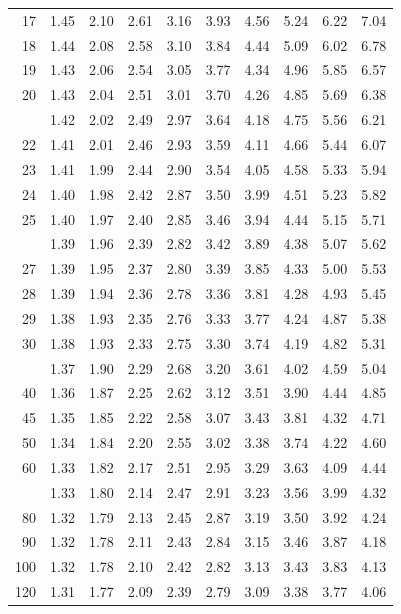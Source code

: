 \documentclass[10pt]{article}
\begin{document}
\begin{longtable}{@{}r!{\vrule width 0.8pt\hspace{0.55em}}rrrrrrrrr@{}}
17 & 1.45 & 2.10 & 2.61 & 3.16 & 3.93 & 4.56 & 5.24 & 6.22 & 7.04 \\
18 & 1.44 & 2.08 & 2.58 & 3.10 & 3.84 & 4.44 & 5.09 & 6.02 & 6.78 \\
19 & 1.43 & 2.06 & 2.54 & 3.05 & 3.77 & 4.34 & 4.96 & 5.85 & 6.57 \\
20 & 1.43 & 2.04 & 2.51 & 3.01 & 3.70 & 4.26 & 4.85 & 5.69 & 6.38 \\
 & 1.42 & 2.02 & 2.49 & 2.97 & 3.64 & 4.18 & 4.75 & 5.56 & 6.21 \\
22 & 1.41 & 2.01 & 2.46 & 2.93 & 3.59 & 4.11 & 4.66 & 5.44 & 6.07 \\
23 & 1.41 & 1.99 & 2.44 & 2.90 & 3.54 & 4.05 & 4.58 & 5.33 & 5.94 \\
24 & 1.40 & 1.98 & 2.42 & 2.87 & 3.50 & 3.99 & 4.51 & 5.23 & 5.82 \\
25 & 1.40 & 1.97 & 2.40 & 2.85 & 3.46 & 3.94 & 4.44 & 5.15 & 5.71 \\
 & 1.39 & 1.96 & 2.39 & 2.82 & 3.42 & 3.89 & 4.38 & 5.07 & 5.62 \\
27 & 1.39 & 1.95 & 2.37 & 2.80 & 3.39 & 3.85 & 4.33 & 5.00 & 5.53 \\
28 & 1.39 & 1.94 & 2.36 & 2.78 & 3.36 & 3.81 & 4.28 & 4.93 & 5.45 \\
29 & 1.38 & 1.93 & 2.35 & 2.76 & 3.33 & 3.77 & 4.24 & 4.87 & 5.38 \\
30 & 1.38 & 1.93 & 2.33 & 2.75 & 3.30 & 3.74 & 4.19 & 4.82 & 5.31 \\
 & 1.37 & 1.90 & 2.29 & 2.68 & 3.20 & 3.61 & 4.02 & 4.59 & 5.04 \\
40 & 1.36 & 1.87 & 2.25 & 2.62 & 3.12 & 3.51 & 3.90 & 4.44 & 4.85 \\
45 & 1.35 & 1.85 & 2.22 & 2.58 & 3.07 & 3.43 & 3.81 & 4.32 & 4.71 \\
50 & 1.34 & 1.84 & 2.20 & 2.55 & 3.02 & 3.38 & 3.74 & 4.22 & 4.60 \\
60 & 1.33 & 1.82 & 2.17 & 2.51 & 2.95 & 3.29 & 3.63 & 4.09 & 4.44 \\
 & 1.33 & 1.80 & 2.14 & 2.47 & 2.91 & 3.23 & 3.56 & 3.99 & 4.32 \\
80 & 1.32 & 1.79 & 2.13 & 2.45 & 2.87 & 3.19 & 3.50 & 3.92 & 4.24 \\
90 & 1.32 & 1.78 & 2.11 & 2.43 & 2.84 & 3.15 & 3.46 & 3.87 & 4.18 \\
100 & 1.32 & 1.78 & 2.10 & 2.42 & 2.82 & 3.13 & 3.43 & 3.83 & 4.13 \\
120 & 1.31 & 1.77 & 2.09 & 2.39 & 2.79 & 3.09 & 3.38 & 3.77 & 4.06 \\

\end{longtable}
\end{document}
